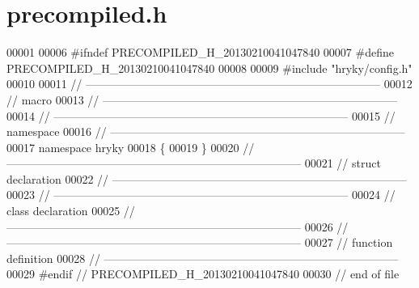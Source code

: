 \hypertarget{core_2include_2precompiled_8h_source}{\section{precompiled.\-h}
}

\begin{DoxyCode}
00001 
00006 \textcolor{preprocessor}{#ifndef PRECOMPILED\_H\_20130210041047840}
00007 \textcolor{preprocessor}{}\textcolor{preprocessor}{#define PRECOMPILED\_H\_20130210041047840}
00008 \textcolor{preprocessor}{}
00009 \textcolor{preprocessor}{#include "hryky/config.h"}
00010 
00011 \textcolor{comment}{//
      ------------------------------------------------------------------------------}
00012 \textcolor{comment}{// macro}
00013 \textcolor{comment}{//
      ------------------------------------------------------------------------------}
00014 \textcolor{comment}{//
      ------------------------------------------------------------------------------}
00015 \textcolor{comment}{// namespace}
00016 \textcolor{comment}{//
      ------------------------------------------------------------------------------}
00017 \textcolor{keyword}{namespace }hryky
00018 \{
00019 \}
00020 \textcolor{comment}{//
      ------------------------------------------------------------------------------}
00021 \textcolor{comment}{// struct declaration}
00022 \textcolor{comment}{//
      ------------------------------------------------------------------------------}
00023 \textcolor{comment}{//
      ------------------------------------------------------------------------------}
00024 \textcolor{comment}{// class declaration}
00025 \textcolor{comment}{//
      ------------------------------------------------------------------------------}
00026 \textcolor{comment}{//
      ------------------------------------------------------------------------------}
00027 \textcolor{comment}{// function definition}
00028 \textcolor{comment}{//
      ------------------------------------------------------------------------------}
00029 \textcolor{preprocessor}{#endif // PRECOMPILED\_H\_20130210041047840}
00030 \textcolor{preprocessor}{}\textcolor{comment}{// end of file}
\end{DoxyCode}
